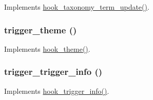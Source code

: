 \label{trigger_8module_a63ef6631e2d47302d35b0d14d880b983}
Implements \hyperlink{group__hooks_ga5c2477516245f0b9d6b04b8a8d227592}{hook\_\-taxonomy\_\-term\_\-update()}. \hypertarget{trigger_8module_a88e0dffc3b44efedcba25a547a629a05}{
\subsubsection[{trigger\_\-theme}]{\setlength{\rightskip}{0pt plus 5cm}trigger\_\-theme ()}}
\label{trigger_8module_a88e0dffc3b44efedcba25a547a629a05}
Implements \hyperlink{group__hooks_ga013ccb45c7aaab1c16cf9691428c910d}{hook\_\-theme()}. \hypertarget{trigger_8module_a3ee804634c1fcba0d2be402649b8571d}{
\subsubsection[{trigger\_\-trigger\_\-info}]{\setlength{\rightskip}{0pt plus 5cm}trigger\_\-trigger\_\-info ()}}
\label{trigger_8module_a3ee804634c1fcba0d2be402649b8571d}
Implements \hyperlink{group__hooks_ga6796483976be1fa22589582444c6fdbb}{hook\_\-trigger\_\-info()}.

